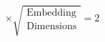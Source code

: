 \documentclass[preview]{standalone}
\begin{document}
\begin{align*}
\times \sqrt{\substack{\text{Embedding} \\ \text{Dimensions}}} = 2
\end{align*}
\end{document}
